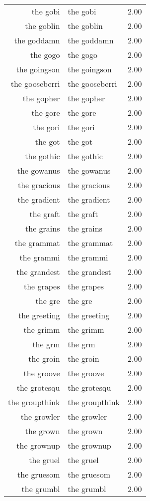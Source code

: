 \begin{table}[ht]
\begin{tabular}{rlr}
  the gobi & the gobi & 2.00 \\ 
  the goblin & the goblin & 2.00 \\ 
  the goddamn & the goddamn & 2.00 \\ 
  the gogo & the gogo & 2.00 \\ 
  the goingson & the goingson & 2.00 \\ 
  the gooseberri & the gooseberri & 2.00 \\ 
  the gopher & the gopher & 2.00 \\ 
  the gore & the gore & 2.00 \\ 
  the gori & the gori & 2.00 \\ 
  the got & the got & 2.00 \\ 
  the gothic & the gothic & 2.00 \\ 
  the gowanus & the gowanus & 2.00 \\ 
  the gracious & the gracious & 2.00 \\ 
  the gradient & the gradient & 2.00 \\ 
  the graft & the graft & 2.00 \\ 
  the grains & the grains & 2.00 \\ 
  the grammat & the grammat & 2.00 \\ 
  the grammi & the grammi & 2.00 \\ 
  the grandest & the grandest & 2.00 \\ 
  the grapes & the grapes & 2.00 \\ 
  the gre & the gre & 2.00 \\ 
  the greeting & the greeting & 2.00 \\ 
  the grimm & the grimm & 2.00 \\ 
  the grm & the grm & 2.00 \\ 
  the groin & the groin & 2.00 \\ 
  the groove & the groove & 2.00 \\ 
  the grotesqu & the grotesqu & 2.00 \\ 
  the groupthink & the groupthink & 2.00 \\ 
  the growler & the growler & 2.00 \\ 
  the grown & the grown & 2.00 \\ 
  the grownup & the grownup & 2.00 \\ 
  the gruel & the gruel & 2.00 \\ 
  the gruesom & the gruesom & 2.00 \\ 
  the grumbl & the grumbl & 2.00 \\ 

\end{tabular}
\end{table}
